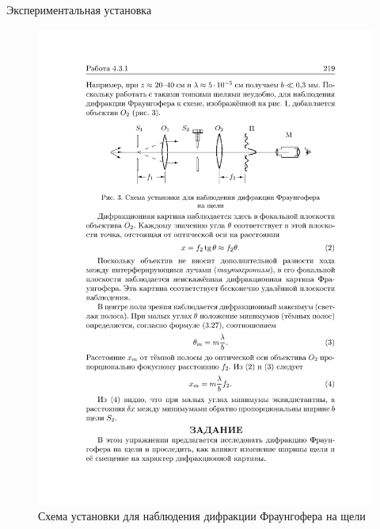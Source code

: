 \documentclass[11pt]{beamer} %
\begin{document}
    \begin{frame}{Экспериментальная установка}
        \begin{figure}[H]
            \centering
            \includegraphics[width = \textwidth]{images/b.pdf}
            \caption{Схема установки для наблюдения дифракции Фраунгофера на щели}
            \label{fig:inst_b}
        \end{figure}
    \end{frame}
\end{document}
